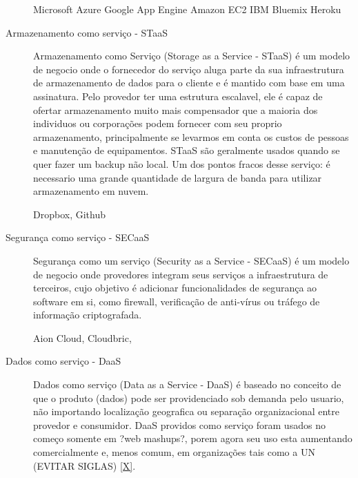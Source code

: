 \begin{description}
		Microsoft Azure
		Google App Engine
		Amazon EC2
		IBM Bluemix
		Heroku

		\item[Armazenamento como serviço - STaaS]
		Armazenamento como Serviço (Storage as a Service - STaaS) é um modelo de negocio onde o fornecedor do serviço aluga parte da sua infraestrutura de armazenamento de dados para o cliente e é mantido com base em uma assinatura. Pelo provedor ter uma estrutura escalavel, ele é capaz de ofertar armazenamento muito mais compensador que a maioria dos individuos ou corporações podem fornecer com seu proprio armazenamento, principalmente se levarmos em conta os custos de pessoas e manutenção de equipamentos. STaaS são geralmente usados quando se quer fazer um backup não local. Um dos pontos fracos desse serviço: é necessario uma grande quantidade de largura de banda para utilizar armazenamento em nuvem.
	
		Dropbox, Github 

		\item[Segurança como serviço - SECaaS]
		Segurança como um serviço (Security as a Service - SECaaS) é um modelo de negocio onde provedores integram seus serviços a infraestrutura de terceiros, cujo objetivo é adicionar funcionalidades de segurança ao software em si, como firewall, verificação de anti-vírus ou tráfego de informação criptografada.
	
		Aion Cloud, Cloudbric, 

		\item[Dados como serviço - DaaS]
		Dados como serviço (Data as a Service - DaaS) é baseado no conceito de que o produto (dados) pode ser providenciado sob demanda pelo usuario, não importando localização geografica ou separação organizacional entre provedor e consumidor. DaaS providos como serviço foram usados no começo somente em ?web mashups?, porem agora seu uso esta aumentando comercialmente e, menos comum, em organizações tais como a UN (EVITAR SIGLAS) \ref{X}.
	


\end{description}
